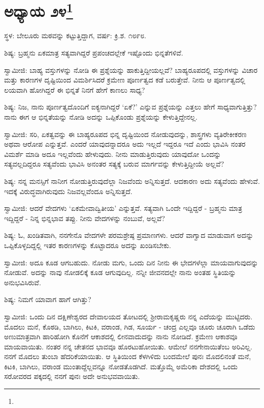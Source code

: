 \chapter[ಅಧ್ಯಾಯ ೨೪]{ಅಧ್ಯಾಯ ೨೪\protect\footnote{}}

\begin{center}
ಸ್ಥಳ: ಬೇಲೂರು ಮಠವನ್ನು ಕಟ್ಟುತ್ತಿದ್ದಾಗ, ವರ್ಷ: ಕ್ರಿ.ಶ. ೧೮೯೮.
\end{center}

ಶಿಷ್ಯ: ಬ್ರಹ್ಮನು ಏಕಮಾತ್ರ ಸತ್ಯವಾಗಿದ್ದರೆ ಪ್ರಪಂಚದಲ್ಲೇಕೆ ಇಷ್ಟೊಂದು ಭಿನ್ನತೆಗಳಿವೆ.

ಸ್ವಾಮೀಜಿ: ಬಾಹ್ಯ ವಸ್ತುಗಳನ್ನು ನೋಡಿ ಈ ಪ್ರಶ್ನೆಯನ್ನು ಹಾಕುತ್ತಿದ್ದೀಯಲ್ಲವೆ? ಬಾಹ್ಯರೂಪದಲ್ಲಿ ವಸ್ತುಗಳನ್ನು ವಿಚಾರ ಮತ್ತು ಕಾರಣಗಳ ದೃಷ್ಟಿಯಿಂದ ವಿಮರ್ಶಿಸಿದರೆ ಕ್ರಮೇಣ ಪೂರ್ಣತ್ವದ ಕಡೆ ಬರುತ್ತೇವೆ. ನೀನು ಆ ಪೂರ್ಣತ್ವದಲ್ಲಿ ಲಯವಾಗಿ ಹೋಗಿದ್ದರೆ ಈ ಭಿನ್ನತೆ ನಿನಗೆ ಹೇಗೆ ಕಾಣಲು ಸಾಧ್ಯ?

ಶಿಷ್ಯ: ನಿಜ, ನಾನು ಪೂರ್ಣತ್ವದೊಂದಿಗೆ ಐಕ್ಯನಾಗಿದ್ದರೆ ‘ಏಕೆ?’ ಎನ್ನುವ ಪ್ರಶ್ನೆಯನ್ನು ಎತ್ತಲು ಹೇಗೆ ಸಾಧ್ಯವಾಗುತ್ತಿತ್ತು? ನಾನು ಈಗ ಆ ಭಿನ್ನತೆಯನ್ನು ನೋಡಿ ಅದನ್ನು ಒಪ್ಪಿಕೊಂಡು ಪ್ರಶ್ನೆಯನ್ನು ಕೇಳುತ್ತಿದ್ದೇನಲ್ಲ.

ಸ್ವಾಮೀಜಿ: ಸರಿ, ಏಕತ್ವವನ್ನು ಈ ಬಾಹ್ಯರೂಪದ ಭಿನ್ನ ದೃಷ್ಟಿಯಿಂದ ನೋಡುವುದನ್ನು, ಶಾಸ್ತ್ರಗಳು ವ್ಯತಿರೇಕೀಕರಣ ಅಥವಾ ಆರೋಪ ಎನ್ನುತ್ತವೆ. ಎಂದರೆ ಯಾವುದನ್ನಾದರೂ ಅದು ಇಲ್ಲದೆ ಇದ್ದರೂ ಇದೆ ಎಂದು ಭಾವಿಸಿ ನಂತರ ವಿಮರ್ಶೆ ಮಾಡಿ ಅದೂ ಇಲ್ಲವೆಂದು ಹೇಳುವುದು. ನೀನು ಮಾಡುತ್ತಿರುವುದು ಯಾವುದೋ ಒಂದನ್ನು ಸತ್ಯವಲ್ಲದಿದ್ದರೂ ಸತ್ಯವೆಂದು ಭಾವಿಸಿ ಅನಂತರ ಸತ್ಯಕ್ಕೆ ಬರುವ ಮಾರ್ಗವನ್ನು ಕೇಳುತ್ತಿದ್ದೀಯೆ ಅಲ್ಲವೆ?

ಶಿಷ್ಯ: ನನ್ನ ಮನಸ್ಸಿಗೆ ನಾನೀಗ ನೋಡುತ್ತಿರುವುದೆಲ್ಲಾ ನಿಜವೆಂದು ಅನ್ನಿಸುತ್ತದೆ. ಆದಕಾರಣ ಅದು ಸತ್ಯವೆಂದು ಹೇಳುವೆ. ಇದಕ್ಕೆ ವಿರುದ್ಧವಾಗಿರುವುದು ನಿಜವಲ್ಲವೆಂದೂ ಅನ್ನಿಸುತ್ತದೆ.

ಸ್ವಾಮೀಜಿ: ಆದರೆ ವೇದಗಳು ‘ಏಕಮೇವಾದ್ವಿತೀಯ’ ಎನ್ನುತ್ತವೆ. ಸತ್ಯವಾಗಿ ಒಂದೇ ಇದ್ದಿದ್ದರೆ - ಬ್ರಹ್ಮನು ಮಾತ್ರ ಇದ್ದಿದ್ದರೆ - ನಿನ್ನ ಭಿನ್ನಭಾವ ತಪ್ಪು. ನೀನು ವೇದಗಳನ್ನು ನಂಬುವೆ, ಅಲ್ಲವೆ?

ಶಿಷ್ಯ: ಓ, ಖಂಡಿತವಾಗಿ, ನನಗೇನೊ ವೇದಗಳೇ ಪರಮಶ್ರೇಷ್ಠ ಪ್ರಮಾಣಗಳು. ಆದರೆ ವಾಗ್ವಾದ ಮಾಡುವಾಗ ಅದನ್ನು ಒಪ್ಪಿಕೊಳ್ಳದಿದ್ದಲ್ಲಿ ಇತರ ಕಾರಣಗಳನ್ನು ಕೊಟ್ಟಾದರೂ ಅದನ್ನು ಖಂಡಿಸಬೇಕು.

ಸ್ವಾಮೀಜಿ: ಅದೂ ಕೂಡ ಆಗಬಹುದು. ನೋಡು ಮಗು, ಒಂದು ದಿನ ನೀನು ಈ ಭೇದಗಳೆಲ್ಲಾ ಮಾಯವಾಗುವುದನ್ನು ನೋಡುವೆ. ಅದನ್ನು ನಾವು ನೋಡಲಿಕ್ಕೆ ಕೂಡ ಆಗುವುದಿಲ್ಲ. ನನ್ನೀ ಜೀವನದಲ್ಲೇ ನಾನು ಅಂತಹ ಸ್ಥಿತಿಯನ್ನು ಅನುಭವಿಸಿರುವೆ.

ಶಿಷ್ಯ: ನಿಮಗೆ ಯಾವಾಗ ಹಾಗೆ ಆಗಿತ್ತು?

ಸ್ವಾಮೀಜಿ: ಒಂದು ದಿನ ದಕ್ಷಿಣೇಶ್ವರದ ದೇವಾಲಯದ ತೋಟದಲ್ಲಿ ಶ‍್ರೀರಾಮಕೃಷ್ಣರು ನನ್ನ ಎದೆಯನ್ನು ಮುಟ್ಟಿದರು. ಮೊದಲು ಮನೆ, ಕೊಠಡಿ, ಬಾಗಿಲು, ಕಿಟಕಿ, ವರಾಂಡ, ಗಿಡ, ಸೂರ್ಯ - ಚಂದ್ರ ಎಲ್ಲವೂ ಚೂರು ಚೂರಾಗಿ ಒಡೆದು ಅಣುಮಾತ್ರವಾಗಿ ಹಾರಿಹೋಗಿ ಕೊನೆಗೆ ಆಕಾಶದಲ್ಲಿ ಲೀನವಾದುದನ್ನು ನಾನು ನೋಡಿದೆ. ಕ್ರಮೇಣ ಆಕಾಶವೂ ಮಾಯವಾಯಿತು. ನಂತರ ನನ್ನ ಚೇತನದ ಭಾವವೂ ಹೊರಟುಹೋಯಿತು. ಆಮೇಲೆ ನನಗೇನಾಯಿತೆಂಬ ಅರಿವಿಲ್ಲ. ನನಗೆ ಮೊದಲು ತುಂಬಾ ಹೆದರಿಕೆಯಾಯಿತು. ಆ ಸ್ಥಿತಿಯಿಂದ ಕೆಳಗಿಳಿದು ಬಂದಮೇಲೆ ಪುನಃ ಮೊದಲಿನಂತೆ ಮನೆ, ಕಿಟಕಿ, ಬಾಗಿಲು, ವರಾಂಡ ಮುಂತಾದ್ದೆಲ್ಲವನ್ನೂ ನೋಡತೊಡಗಿದೆ. ಮತ್ತೊಮ್ಮೆ ಅಮೆರಿಕಾ ದೇಶದಲ್ಲಿ ಒಂದು ಸರೋವರದ ಪಕ್ಕದಲ್ಲಿ ನನಗೆ ಪುನಃ ಅದೇ ಅನುಭವವಾಯಿತು.

